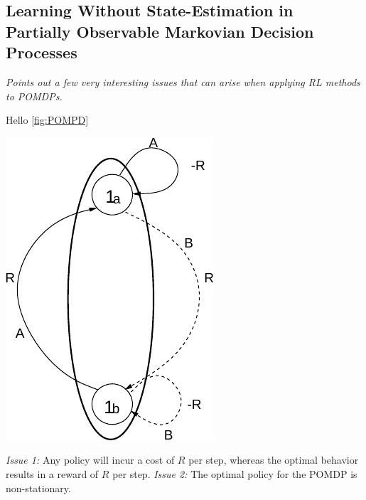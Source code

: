 \documentclass[a4paper, fontsize=8pt, landscape, DIV=1]{scrartcl}
\begin{document}
\begin{multicols*}{3}
\subsection{Learning Without State-Estimation in Partially Observable Markovian Decision Processes}
\textit{Points out a few very interesting issues that can arise when applying RL methods to POMDPs.}
\begin{minipage}{0.6\columnwidth}
Hello \ref{fig:POMPD}
\end{minipage}
\begin{minipage}{0.4\columnwidth}
\includegraphics[width=\textwidth]{img/POMDP.jpg}
\label{fig:POMDP}
\end{minipage}
\textit{Issue 1:} Any policy will incur a cost of $R$ per step, whereas the optimal behavior results in a reward of $R$ per step.
\textit{Issue 2:} The optimal policy for the POMDP is non-stationary.


\end{multicols*}
\end{document}
